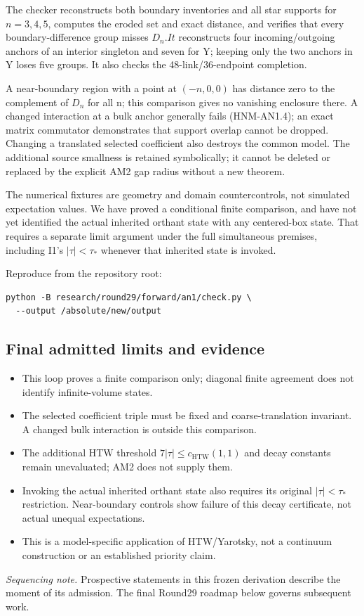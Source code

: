 The checker reconstructs both boundary inventories and all star supports for \(n=3,4,5\), computes the eroded set and exact distance, and verifies that every boundary-difference group misses \(D_n. It\) reconstructs four incoming/outgoing anchors of an interior singleton and seven for Y; keeping only the two anchors in Y loses five groups. It also checks the 48-link/36-endpoint completion.

A near-boundary region with a point at \((-n,0,0)\) has distance zero to the complement of \(D_n\) for all n; this comparison gives no vanishing enclosure there. A changed interaction at a bulk anchor generally fails (HNM-AN1.4); an exact matrix commutator demonstrates that support overlap cannot be dropped. Changing a translated selected coefficient also destroys the common model. The additional source smallness is retained symbolically; it cannot be deleted or replaced by the explicit AM2 gap radius without a new theorem.

The numerical fixtures are geometry and domain countercontrols, not simulated expectation values. We have proved a conditional finite comparison, and have not yet identified the actual inherited orthant state with any centered-box state. That requires a separate limit argument under the full simultaneous premises, including I1's \(|\tau|<\tau_*\) whenever that inherited state is invoked.

Reproduce from the repository root:
\begin{verbatim}
python -B research/round29/forward/an1/check.py \
  --output /absolute/new/output
\end{verbatim}

\subsection*{Final admitted limits and evidence}
\begin{itemize}
\item This loop proves a finite comparison only; diagonal finite agreement does not identify infinite-volume states.
\item The selected coefficient triple must be fixed and coarse-translation invariant. A changed bulk interaction is outside this comparison.
\item The additional HTW threshold \(7|\tau|\le c_{\mathrm{HTW}}(1,1)\) and decay constants remain unevaluated; AM2 does not supply them.
\item Invoking the actual inherited orthant state also requires its original \(|\tau|<\tau_*\) restriction. Near-boundary controls show failure of this decay certificate, not actual unequal expectations.
\item This is a model-specific application of HTW/Yarotsky, not a continuum construction or an established priority claim.
\end{itemize}
\par{}\par{}

\emph{Sequencing note.} Prospective statements in this frozen derivation describe the moment of its admission. The final Round29 roadmap below governs subsequent work.
